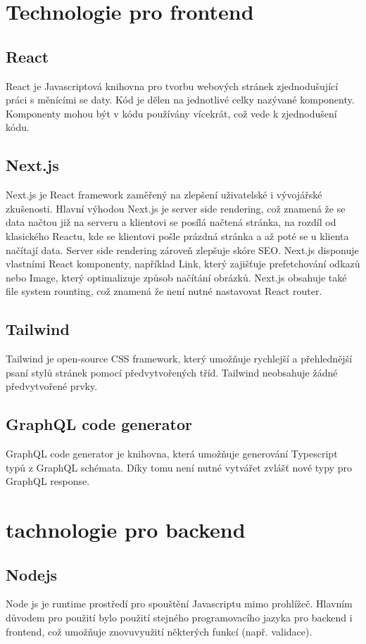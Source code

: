 \documentclass[12pt, a4paper,
 twoside,        %
 openright
]{report}
\begin{document}
\section{Technologie pro frontend}
\subsection{React}
React je Javascriptová knihovna pro tvorbu webových stránek zjednodušující práci s měnícími se daty. Kód je dělen na jednotlivé celky nazývané komponenty. Komponenty mohou být v kódu používány vícekrát, což vede k zjednodušení kódu.
\subsection{Next.js}
Next.js je React framework zaměřený na zlepšení uživatelské i vývojářské zkušenosti. Hlavní výhodou Next.js je server side rendering, což znamená že se data načtou již na serveru a klientovi se posílá načtená stránka, na rozdíl od klasického Reactu, kde se klientovi pošle prázdná stránka a až poté se u klienta načítají data. Server side rendering zároveň zlepšuje skóre SEO. Next.js disponuje vlastními React komponenty, například Link, který zajišťuje prefetchování odkazů nebo Image, který optimalizuje způsob načítání obrázků. Next.js obsahuje také file system rounting, což znamená že není nutné nastavovat React router.
\subsection{Tailwind}
Tailwind je open-source CSS framework, který umožňuje rychlejší a přehlednější psaní stylů stránek pomocí předvytvořených tříd. Tailwind neobsahuje žádné předvytvořené prvky.
\subsection{GraphQL code generator}
GraphQL code generator je knihovna, která umožňuje generování Typescript typů z GraphQL schémata. Díky tomu není nutné vytvářet zvlášť nové typy pro GraphQL response.
\section{tachnologie pro backend}
\subsection{Nodejs}
Node js je runtime prostředí pro spouštění Javascriptu mimo prohlížeč. Hlavním důvodem pro použití bylo použití stejného programovacího jazyka pro backend i frontend, což umožňuje znovuvyužití některých funkcí (např. validace).
\end{document}
